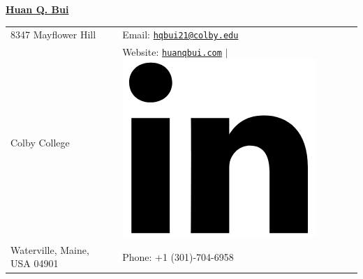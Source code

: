 \documentclass[10pt]{article}
\newcommand{\longunderline}[1]{\uline{#1\hfill\mbox{}}}
\begin{document}
\noindent  \longunderline{\LARGE{\textbf{Huan Q. Bui}}}  \\
\vspace{-1ex}

\normalsize


\begin{center}
\begin{tabular}{l l}
     8347 Mayflower Hill 		 & \hspace{1in} Email: \href{mailto:hqbui21@colby.edu}{\texttt{hqbui21@colby.edu}} \\
     Colby College 				 & \hspace{1in}  Website: \href{www.huanqbui.com}{\texttt{huanqbui.com}} $\vert$ 					\href{https://www.linkedin.com/in/huan-bui/}{\includegraphics[scale=0.04]{linkedin_logo.PNG}}\\
 	Waterville, Maine, USA 04901 & \hspace{1in} Phone: +1 (301)-704-6958\\
\end{tabular}
\end{center}
\end{document}
